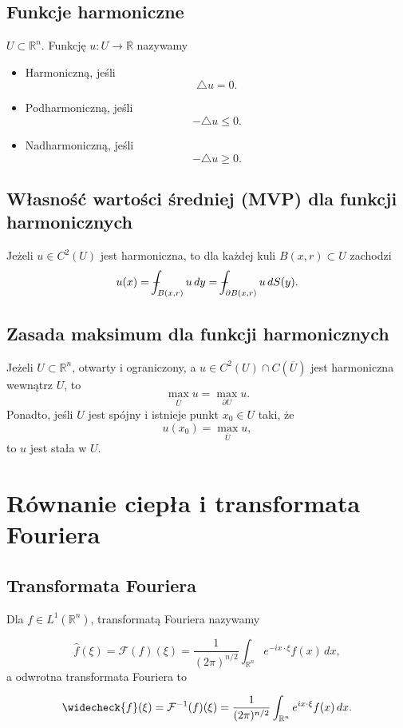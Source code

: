 \documentclass[letterpaper,12pt]{article}
\def\Xint#1{\mathchoice
   {\XXint\displaystyle\textstyle{#1}}%
   {\XXint\textstyle\scriptstyle{#1}}%
   {\XXint\scriptstyle\scriptscriptstyle{#1}}%
   {\XXint\scriptscriptstyle\scriptscriptstyle{#1}}%
   \!\int}
\def\XXint#1#2#3{{\setbox0=\hbox{$#1{#2#3}{\int}$}
     \vcenter{\hbox{$#2#3$}}\kern-.5\wd0}}
\def\dashint{\Xint-}
\newcommand{\R}{\mathbb{R}}
\newcommand{\F}{\mathcal{F}}
\renewcommand{\leq}{\leqslant}
\renewcommand{\geq}{\geqslant}
\begin{document}
\subsection{Funkcje harmoniczne}

$U \subset \R^n$. Funkcję $u: U \to \R$ nazywamy
\begin{itemize}
    \item Harmoniczną, jeśli $$\triangle u = 0.$$
    \item Podharmoniczną, jeśli $$-\triangle u \leq 0.$$
    \item Nadharmoniczną, jeśli $$-\triangle u \geq 0.$$
\end{itemize}

\subsection{Własność wartości średniej (MVP) dla funkcji harmonicznych}
Jeżeli $u \in C^2(U)$ jest harmoniczna, to dla każdej kuli $B(x, r) \subset U$ zachodzi
$$ u(x) =  \dashint_{B(x,r)} u\,dy = \dashint_{\partial B(x,r)} u\,dS(y).$$

\subsection{Zasada maksimum dla funkcji harmonicznych}
Jeżeli $U \subset \R^n$, otwarty i ograniczony, a $u \in C^2(U) \cap C(\overline{U})$ jest harmoniczna wewnątrz $U$, to
$$ \max_{\overline{U}} u = \max_{\partial U} u.$$
Ponadto, jeśli $U$ jest spójny i istnieje punkt $x_0 \in U$ taki, że
$$ u(x_0) = \max_{\overline{U}} u,$$
to $u$ jest stała w $U$.

\section{Równanie ciepła i transformata Fouriera}

\subsection{Transformata Fouriera}
Dla $f \in L^1(\R^n)$, transformatą Fouriera nazywamy

$$ \widehat{f}(\xi) = \F(f)(\xi) = \frac{1}{(2\pi)^{n/2}} \int_{\R^n} e^{-ix \cdot \xi} f(x)\,dx, $$
a odwrotna transformata Fouriera to

$$\widecheck{f}(\xi) = \F^{-1}(f)(\xi) = \frac{1}{(2\pi)^{n/2}} \int_{\R^n} e^{ix \cdot \xi} f(x)\,dx. $$
\end{document}
